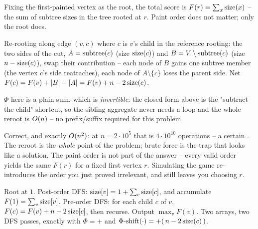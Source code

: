 \begin{observation}
Fixing the first-painted vertex as the root, the total score is
$F(r)=\sum_{x}\operatorname{size}(x)$ -- the sum of subtree sizes in the tree rooted at $r$.
Paint order does not matter; only the root does.
\end{observation}
\begin{observation}
Re-rooting along edge $(v,c)$ where $c$ is $v$'s child in the reference rooting:
the two sides of the cut, $A=\operatorname{subtree}(c)$ (size $\operatorname{size}(c)$) and
$B=V\setminus\operatorname{subtree}(c)$ (size $n-\operatorname{size}(c)$), swap their contribution --
each node of $B$ gains one subtree member (the vertex $c$'s side reattaches),
each node of $A\setminus\{c\}$ loses the parent side. Net
$F(c)=F(v)+\lvert B\rvert-\lvert A\rvert=F(v)+n-2\operatorname{size}(c)$.
\end{observation}
\begin{observation}
$\Phi$ here is a plain sum, which is \emph{invertible}: the closed form above
is the "subtract the child" shortcut, so the sibling aggregate never needs a
loop and the whole reroot is $O(n)$ -- no prefix/suffix required for this
problem.
\end{observation}

\begin{thinkbox}
{Correct, and exactly $O(n^2)$: at $n=2\cdot10^{5}$ that is $4\cdot10^{10}$
operations -- a certain \tle. The reroot is the \emph{whole} point of the
problem; brute force is the trap that looks like a solution.}
{The paint order is not part of the answer -- every valid order yields the same
$F(r)$ for a fixed first vertex $r$. Simulating the game re-introduces the
order you just proved irrelevant, and still leaves you choosing $r$.}
\end{thinkbox}

Root at $1$. Post-order DFS: $\operatorname{size}[v]=1+\sum_{c}\operatorname{size}[c]$, and accumulate
$F(1)=\sum_v\operatorname{size}[v]$. Pre-order DFS: for each child $c$ of $v$,
$F(c)=F(v)+n-2\operatorname{size}[c]$, then recurse. Output $\max_{v} F(v)$. Two arrays, two
DFS passes, exactly  with $\Phi=+$ and
$\Phi\text{-shift}(\cdot)=+(\,n-2\operatorname{size}(c)\,)$.

